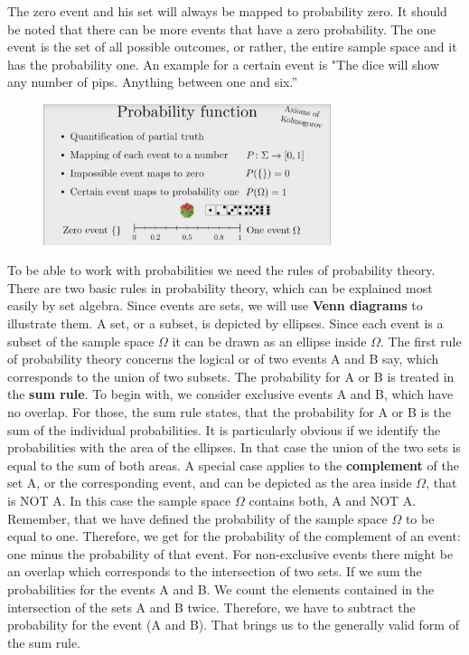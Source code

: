 \documentclass[12pt, a4paper]{scrartcl}
\begin{document}
 The zero event and his set will always be mapped to probability zero. It should be noted that there can be more events that have a zero probability. The one event is the set of all possible outcomes, or rather, the entire sample space and it has the probability one. An example for a certain event is "The dice will show any number of pips. Anything between one and six.” 
\begin{figure}[H]
	\centering
	\includegraphics[width=0.75\textwidth]{1_2.png}
\end{figure}
To be able to work with probabilities we need the rules of probability theory. There are two basic rules in probability theory, which can be explained most easily by set algebra.
Since events are sets, we will use \textbf{Venn diagrams} to illustrate them.
A set, or a subset, is depicted by ellipses. Since each event is a subset of the sample space $\Omega$ it can be drawn as an ellipse inside $\Omega$. The first rule of probability theory concerns the logical or of two events A and B say, which corresponds to the union of two subsets. The probability for A or B is treated in the \textbf{sum rule}. To begin with, we consider exclusive events A and B, which have no overlap. For those, the sum rule states, that the probability for A or B is the sum of the individual probabilities. It is particularly obvious if we identify the probabilities with the area of the ellipses. In that case the union of the two sets is equal to the sum of both areas.
A special case applies to the \textbf{complement} of the set A, or the corresponding event, and can be depicted as the area inside $\Omega$, that is NOT A.
In this case the sample space $\Omega$ contains both, A and NOT A. Remember, that we have defined the probability of the sample space $\Omega$ to be equal to one. Therefore, we get for the probability of the complement of an event: one minus the probability of that event.
For non-exclusive events there might be an overlap which corresponds to the intersection of two sets. If we sum the probabilities for the events A and B. We count the elements contained in the intersection of the sets A and B twice. Therefore, we have to subtract the probability for the event (A and B). That brings us to the generally valid form of the sum rule. 
\end{document}
